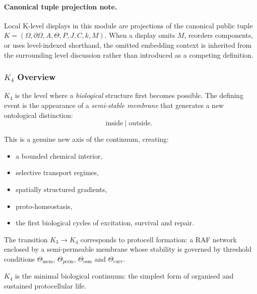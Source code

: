 



\paragraph{Canonical tuple projection note.}
Local K-level displays in this module are projections of the canonical public tuple \(K=(\Omega,\partial\Omega,A,\Theta,P,J,C,k,M)\). When a display omits \(M\), reorders components, or uses level-indexed shorthand, the omitted embedding context is inherited from the surrounding level discussion rather than introduced as a competing definition.

\subsubsection{\texorpdfstring{$K_4$}{K_4} Overview}
\label{sec:k4-overview}

$K_4$ is the level where a \emph{biological} structure first becomes
possible. The defining event is the appearance of a \emph{semi-stable
membrane} that generates a new ontological distinction:
\[
\text{inside} \;|\; \text{outside}.
\]

This is a genuine new axis of the continuum, creating:
\begin{itemize}
    \item a bounded chemical interior,
    \item selective transport regimes,
    \item spatially structured gradients,
    \item proto-homeostasis,
    \item the first biological cycles of excitation, survival and repair.
\end{itemize}

The transition $K_3 \to K_4$ corresponds to protocell formation: a RAF
network enclosed by a semi-permeable membrane whose stability is governed
by threshold conditions $\Theta_{\mathrm{mem}}$,
$\Theta_{\mathrm{perm}}$, $\Theta_{\mathrm{osm}}$ and
$\Theta_{\mathrm{curv}}$.

$K_4$ is the minimal biological continuum: the simplest form of organised
and sustained protocellular life.

